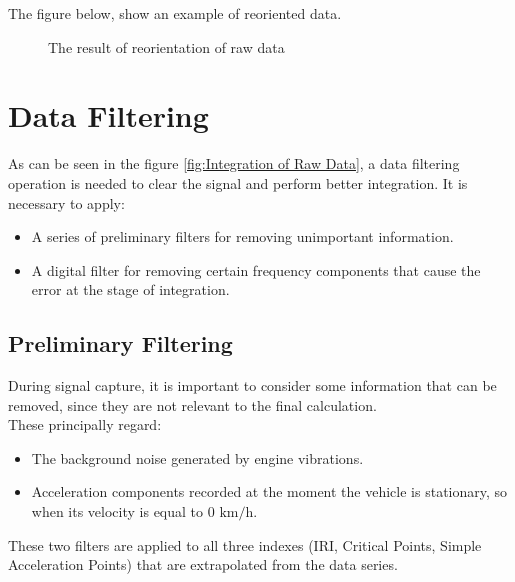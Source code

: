 \documentclass{standalone}
\begin{document}
\noindent The figure below, show an example of reoriented data.
\begin{figure}[ht]
  \centering
  

 
  \caption{The result of reorientation of raw data}
  \label{fig:Accelerometer Reoriented}
\end{figure}

\section{Data Filtering} \label{Data Filtering}
As can be seen in the figure \ref{fig:Integration of Raw Data}, a data filtering operation is needed to clear the signal and perform better integration.
It is necessary to apply:

\begin{itemize}
\item A series of preliminary filters for removing unimportant information.
\item A digital filter for removing certain frequency components that cause the error at the stage of integration.
\end{itemize}



\subsection{Preliminary Filtering}\label{Preliminary Filtering}
During signal capture, it is important to consider some information that can be removed, since they are not relevant to the final calculation.\\
These principally regard:
\begin{itemize}
\item The background noise generated by engine vibrations.
\item Acceleration components recorded at the moment the vehicle is stationary, so when its velocity is equal to $0$ $\si{\km\per\hour}$.
\end{itemize}

\noindent These two filters are applied to all three indexes (IRI, Critical Points, Simple Acceleration Points) that are extrapolated from the data series.
\end{document}

